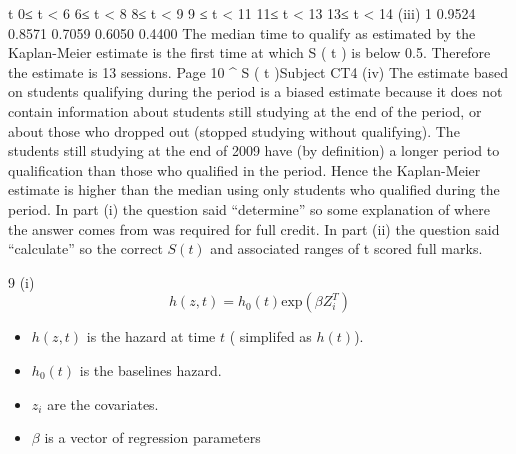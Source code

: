 \documentclass[a4paper,12pt]{article}
\begin{document}
\begin{enumerate}
t
0≤ t < 6
6≤ t < 8
8≤ t < 9
9 ≤ t < 11
11≤ t < 13
13≤ t < 14
(iii)
1
0.9524
0.8571
0.7059
0.6050
0.4400
The median time to qualify as estimated by the Kaplan-Meier estimate
is the first time at which S ( t ) is below 0.5.
Therefore the estimate is 13 sessions.
Page 10
^
S ( t )Subject CT4 %
(iv)
The estimate based on students qualifying during the period is a biased estimate because it does not contain information
about students still studying at the end of the period, or about those who dropped out (stopped studying without qualifying).
The students still studying at the end of 2009 have (by definition) a longer period to qualification than those who qualified in the period.
Hence the Kaplan-Meier estimate is higher than the median using only students who qualified during the period.
In part (i) the question said “determine” so some explanation of where the answer comes from was required for full credit. In part (ii) the question said “calculate” so the correct $S(t)$ and associated ranges of t scored full marks.
\newpage

9
(i)
\[ h(z,t) = h_0(t) \mbox{exp}(\beta Z_i^{T})\]

\begin{itemize}
\item $h(z,t)$ is the hazard at time $t$ ( simplifed as $h(t)$).
\item $h_0(t)$ is the baselines hazard.
\item $z_i$ are the covariates.
\item $\beta$ is a vector of regression parameters
\end{itemize}


\end{enumerate}
\end{document}
